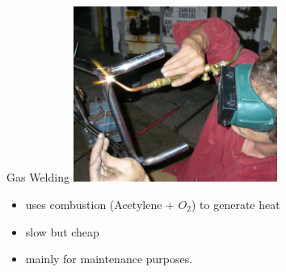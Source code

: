 \documentclass[10pt, svgnames]{beamer}
\begin{document}
\begin{frame}[label={sec:org2056234}]{Gas Welding}
\centering
\includegraphics[width=0.5\textwidth]{pictures/gas-welding}
\begin{itemize}
\item uses combustion (Acetylene + $O_2$) to generate heat
\item slow but cheap
\item mainly for maintenance purposes.
\end{itemize}
\end{frame}
\end{document}
